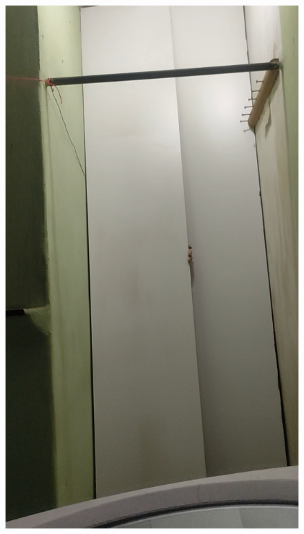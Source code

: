 \begin{figure}[htbp]
    \centering
        \begin{minipage}{0.4\textwidth}
            \includegraphics[width=\textwidth]{figuras/filter/mask/ambiente.png}
        \end{minipage}
        \begin{minipage}{0.4\textwidth}

\end{minipage}
\end{figure}
